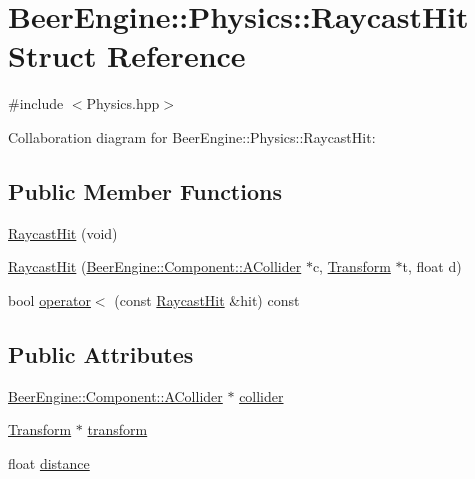 \hypertarget{struct_beer_engine_1_1_physics_1_1_raycast_hit}{}\section{Beer\+Engine\+:\+:Physics\+:\+:Raycast\+Hit Struct Reference}
\label{struct_beer_engine_1_1_physics_1_1_raycast_hit}


{\ttfamily \#include $<$Physics.\+hpp$>$}



Collaboration diagram for Beer\+Engine\+:\+:Physics\+:\+:Raycast\+Hit\+:
\subsection*{Public Member Functions}
\begin{DoxyCompactItemize}
\item 
\mbox{\hyperlink{struct_beer_engine_1_1_physics_1_1_raycast_hit_a8395ce0eae1b9205fa860d9bf883329e}{Raycast\+Hit}} (void)
\item 
\mbox{\hyperlink{struct_beer_engine_1_1_physics_1_1_raycast_hit_a3a90e49816f4e619b4cdf863f9d0d285}{Raycast\+Hit}} (\mbox{\hyperlink{class_beer_engine_1_1_component_1_1_a_collider}{Beer\+Engine\+::\+Component\+::\+A\+Collider}} $\ast$c, \mbox{\hyperlink{class_beer_engine_1_1_transform}{Transform}} $\ast$t, float d)
\item 
bool \mbox{\hyperlink{struct_beer_engine_1_1_physics_1_1_raycast_hit_a985cc0a92cdc84779d87a28557c58a0d}{operator$<$}} (const \mbox{\hyperlink{struct_beer_engine_1_1_physics_1_1_raycast_hit}{Raycast\+Hit}} \&hit) const
\end{DoxyCompactItemize}
\subsection*{Public Attributes}
\begin{DoxyCompactItemize}
\item 
\mbox{\hyperlink{class_beer_engine_1_1_component_1_1_a_collider}{Beer\+Engine\+::\+Component\+::\+A\+Collider}} $\ast$ \mbox{\hyperlink{struct_beer_engine_1_1_physics_1_1_raycast_hit_a89dc9cb3b03c9c47d15a15e60e4be44a}{collider}}
\item 
\mbox{\hyperlink{class_beer_engine_1_1_transform}{Transform}} $\ast$ \mbox{\hyperlink{struct_beer_engine_1_1_physics_1_1_raycast_hit_aaf554d2ee6c3eb56b7af00d5a26ad006}{transform}}
\item 
float \mbox{\hyperlink{struct_beer_engine_1_1_physics_1_1_raycast_hit_aa417105761ef05052ea03b8f566c6c45}{distance}}
\end{DoxyCompactItemize}


